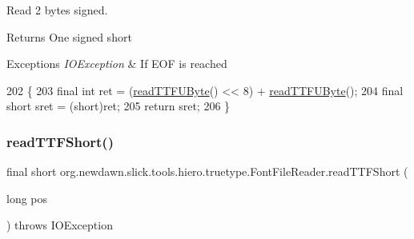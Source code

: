 Read 2 bytes signed.

\begin{DoxyReturn}{Returns}
One signed short 
\end{DoxyReturn}

\begin{DoxyExceptions}{Exceptions}
{\em I\+O\+Exception} & If E\+OF is reached \\
\hline
\end{DoxyExceptions}

\begin{DoxyCode}
202                                                          \{
203         \textcolor{keyword}{final} \textcolor{keywordtype}{int} ret = (\mbox{\hyperlink{classorg_1_1newdawn_1_1slick_1_1tools_1_1hiero_1_1truetype_1_1_font_file_reader_af208587b367fbf19afbfd0cb584b7563}{readTTFUByte}}() << 8) + \mbox{\hyperlink{classorg_1_1newdawn_1_1slick_1_1tools_1_1hiero_1_1truetype_1_1_font_file_reader_af208587b367fbf19afbfd0cb584b7563}{readTTFUByte}}();
204         \textcolor{keyword}{final} \textcolor{keywordtype}{short} sret = (short)ret;
205         \textcolor{keywordflow}{return} sret;
206     \}
\end{DoxyCode}
\mbox{\label{classorg_1_1newdawn_1_1slick_1_1tools_1_1hiero_1_1truetype_1_1_font_file_reader_a073573f88e9174bcfc819be0147a74db}} 
\subsubsection{\texorpdfstring{read\+T\+T\+F\+Short()}{readTTFShort()}\hspace{0.1cm}{\footnotesize\ttfamily [2/2]}}
{\footnotesize\ttfamily final short org.\+newdawn.\+slick.\+tools.\+hiero.\+truetype.\+Font\+File\+Reader.\+read\+T\+T\+F\+Short (\begin{DoxyParamCaption}\item[{long}]{pos }\end{DoxyParamCaption}) throws I\+O\+Exception\hspace{0.3cm}{\ttfamily [inline]}}

